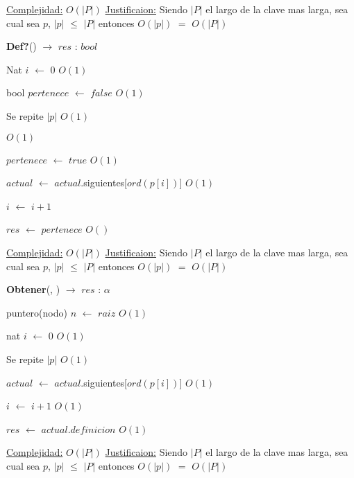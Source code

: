 \begin{Algoritmos}
\begin{algorithm}[H]
\begin{algorithmic}[1]
\medskip
\State \underline{Complejidad:} $O(|P|)$
\State \underline{Justificaion:} Siendo $|P|$ el largo de la clave mas larga, sea cual sea $p$, $|p|$ $\leq$ $|P|$ entonces 	$O(|p|)$ $=$ $O(|P|)$


\end{algorithmic}
\end{algorithm}  
  
  
\begin{algorithm}[H]
{\textbf{Def?}() $\to$ $res$ : $bool$}
\begin{algorithmic}[1]

\State Nat $i$ $\gets$ $0$ \Comment $O(1)$

\State bool $pertenece$ $\gets$ $false$ \Comment $O(1)$

   \Comment Se repite $|p|$ $O(1)$
		
	
	 \Comment $O(1)$

		\State $pertenece$ $\gets$ $true$ \Comment $O(1)$	 
	
	\EndIf
	
	\State $actual$ $\gets$ $actual$.siguientes[$ord(p[i])$] \Comment $O(1)$

	\State $i$ $\gets$ $i + 1$
\EndWhile 

\State $res$ $\gets$ $pertenece$ \Comment $O()$ 

\medskip
\State \underline{Complejidad:} $O(|P|)$
\State \underline{Justificaion:} Siendo $|P|$ el largo de la clave mas larga, sea cual sea $p$, $|p|$ $\leq$ $|P|$ entonces 	$O(|p|)$ $=$ $O(|P|)$

\end{algorithmic}
\end{algorithm}
  

\begin{algorithm}[H]
{\textbf{Obtener}(, }) $\to$ $res$ : $\alpha$
\begin{algorithmic}[1]

\State puntero(nodo) $n$ $\gets$ $raiz$ \Comment $O(1)$

\State nat $i$ $\gets$ $0$ \Comment $O(1)$


   \Comment Se repite $|p|$ $O(1)$
		

	\State $actual$ $\gets$ $actual$.siguientes[$ord(p[i])$] \Comment $O(1)$

	\State $i$ $\gets$ $i + 1$ \Comment $O(1)$
\EndWhile 


\State $res$ $\gets$ $actual$.$definicion$ \Comment $O(1)$ 

\medskip
\State \underline{Complejidad:} $O(|P|)$
\State \underline{Justificaion:} Siendo $|P|$ el largo de la clave mas larga, sea cual sea $p$, $|p|$ $\leq$ $|P|$ entonces 	$O(|p|)$ $=$ $O(|P|)$

\end{algorithmic}
\end{algorithm}
  
  
\end{Algoritmos}

